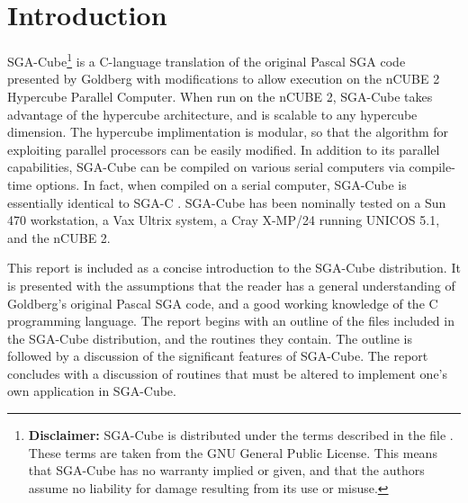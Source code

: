 \maketitle

\section{Introduction}
SGA-Cube\footnote{{\bf Disclaimer:} SGA-Cube is distributed under the terms described
in the file {}. These terms are taken from the GNU General Public
License.
This means that SGA-Cube has no warranty implied or given, and that the
authors assume no liability for damage resulting from its use or misuse.} 
is a C-language translation of the original
Pascal SGA code presented by Goldberg \citeyear{Goldberg:89e}
with modifications to allow execution on the nCUBE 2 Hypercube Parallel
Computer. 
When run on the nCUBE 2,
SGA-Cube takes advantage of the hypercube architecture, and is scalable to
any hypercube dimension. 
The hypercube implimentation is modular, so that the algorithm for
exploiting parallel processors can be easily modified.
In addition to its parallel capabilities, SGA-Cube can be
compiled on various serial computers via compile-time options.
In fact, when compiled on a serial computer, SGA-Cube is essentially
identical to SGA-C \cite{Smith:91}.
SGA-Cube has been nominally
tested on a Sun 470 workstation, a Vax Ultrix system, a Cray X-MP/24 
running UNICOS 5.1, and the nCUBE 2.

This report is included as a concise introduction to the SGA-Cube distribution.
It is presented with the assumptions that the reader has a general understanding
of Goldberg's original Pascal SGA code, and a good working knowledge of the
C programming language.
The report begins with an outline of the files included in the SGA-Cube
distribution, and the routines they contain. 
The outline is followed by a discussion of the 
significant features of SGA-Cube.
The report concludes with a
discussion of routines that must be altered to
implement one's own application in SGA-Cube.

